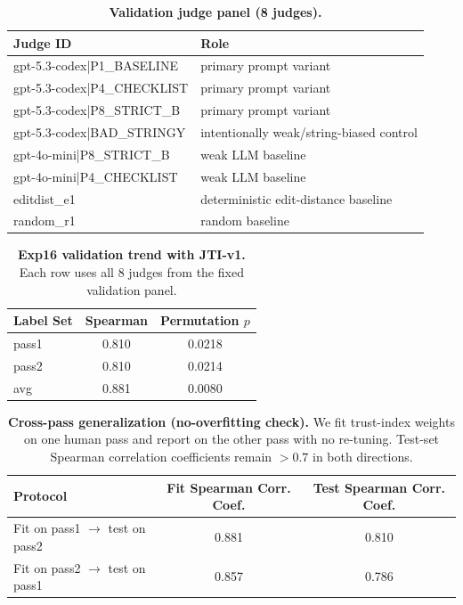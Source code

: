\documentclass{article}
\begin{document}
\begin{table}[t]
  \centering
  \small
  \begin{tabular}{ll}
    \toprule
    \textbf{Judge ID} & \textbf{Role} \\
    \midrule
    gpt-5.3-codex|P1\_BASELINE & primary prompt variant \\
    gpt-5.3-codex|P4\_CHECKLIST & primary prompt variant \\
    gpt-5.3-codex|P8\_STRICT\_B & primary prompt variant \\
    gpt-5.3-codex|BAD\_STRINGY & intentionally weak/string-biased control \\
    gpt-4o-mini|P8\_STRICT\_B & weak LLM baseline \\
    gpt-4o-mini|P4\_CHECKLIST & weak LLM baseline \\
    editdist\_e1 & deterministic edit-distance baseline \\
    random\_r1 & random baseline \\
    \bottomrule
  \end{tabular}
  \caption{\textbf{Validation judge panel (8 judges).}}
  \label{tab:judge_panel_8}
\end{table}

\begin{table}[t]
  \centering
  \small
  \begin{tabular}{lcc}
    \toprule
    \textbf{Label Set} & \textbf{Spearman} & \textbf{Permutation \(p\)} \\
    \midrule
    pass1              & 0.810 & 0.0218 \\
    pass2              & 0.810 & 0.0214 \\
    avg                & 0.881 & 0.0080 \\
    \bottomrule
  \end{tabular}
  \caption{\textbf{Exp16 validation trend with JTI-v1.}
    Each row uses all \(8\) judges from the fixed validation panel.}
  \label{tab:exp16_final_trend}
\end{table}

\begin{table}[t]
  \centering
  \small
  \begin{tabular}{lcc}
    \toprule
    \textbf{Protocol}                          & \textbf{Fit Spearman Corr. Coef.} & \textbf{Test Spearman Corr. Coef.} \\
    \midrule
    Fit on pass1 \(\rightarrow\) test on pass2 & 0.881                             & 0.810                              \\
    Fit on pass2 \(\rightarrow\) test on pass1 & 0.857                             & 0.786                              \\
    \bottomrule
  \end{tabular}
  \caption{\textbf{Cross-pass generalization (no-overfitting check).}
    We fit trust-index weights on one human pass and report on the other pass with no re-tuning.
    Test-set Spearman correlation coefficients remain \(>0.7\) in both directions.}
  \label{tab:cross_pass_generalization}
\end{table}
\end{document}
